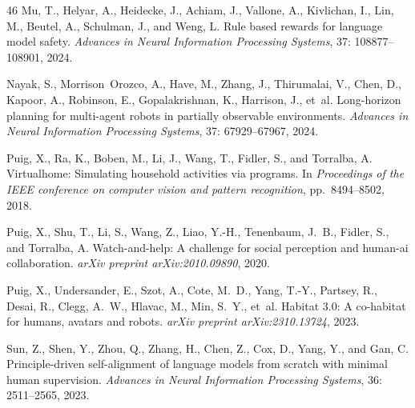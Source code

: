 \documentclass{article}
\theoremstyle{plain}
\theoremstyle{definition}
\theoremstyle{remark}
\begin{document}
\begin{thebibliography}{46}
Mu, T., Helyar, A., Heidecke, J., Achiam, J., Vallone, A., Kivlichan, I., Lin,
  M., Beutel, A., Schulman, J., and Weng, L.
\newblock Rule based rewards for language model safety.
\newblock \emph{Advances in Neural Information Processing Systems},
  37: 108877--108901, 2024.

Nayak, S., Morrison~Orozco, A., Have, M., Zhang, J., Thirumalai, V., Chen, D.,
  Kapoor, A., Robinson, E., Gopalakrishnan, K., Harrison, J., et~al.
\newblock Long-horizon planning for multi-agent robots in partially observable
  environments.
\newblock \emph{Advances in Neural Information Processing Systems},
  37: 67929--67967, 2024.

Puig, X., Ra, K., Boben, M., Li, J., Wang, T., Fidler, S., and Torralba, A.
\newblock Virtualhome: Simulating household activities via programs.
\newblock In \emph{Proceedings of the IEEE conference on computer vision and
  pattern recognition}, pp.\  8494--8502, 2018.

Puig, X., Shu, T., Li, S., Wang, Z., Liao, Y.-H., Tenenbaum, J.~B., Fidler, S.,
  and Torralba, A.
\newblock Watch-and-help: A challenge for social perception and human-ai
  collaboration.
\newblock \emph{arXiv preprint arXiv:2010.09890}, 2020.

Puig, X., Undersander, E., Szot, A., Cote, M.~D., Yang, T.-Y., Partsey, R.,
  Desai, R., Clegg, A.~W., Hlavac, M., Min, S.~Y., et~al.
\newblock Habitat 3.0: A co-habitat for humans, avatars and robots.
\newblock \emph{arXiv preprint arXiv:2310.13724}, 2023.

Sun, Z., Shen, Y., Zhou, Q., Zhang, H., Chen, Z., Cox, D., Yang, Y., and Gan,
  C.
\newblock Principle-driven self-alignment of language models from scratch with
  minimal human supervision.
\newblock \emph{Advances in Neural Information Processing Systems},
  36: 2511--2565, 2023.


\end{thebibliography}
\end{document}
